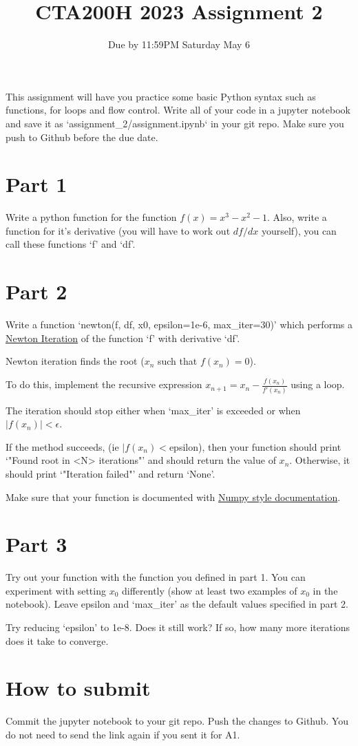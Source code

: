 \documentclass{article}
\title{CTA200H 2023 Assignment 2}
\author{Due by 11:59PM Saturday May 6}
\date{}
\begin{document}
\maketitle

This assignment will have you practice some basic Python syntax such as functions, for loops and flow control. Write all of your code in a jupyter notebook and save it as `assignment\_2/assignment.ipynb` in your git repo. Make sure you push to Github before the due date.

\section*{Part 1}

Write a python function for the function $f(x) = x^3 - x^2 - 1$. Also, write a function for it's derivative (you will have to work out $df/dx$ yourself), you can call these functions `f' and `df'.

\section*{Part 2}

Write a function `newton(f, df, x0, epsilon=1e-6, max\_iter=30)' which performs a \href{https://en.wikipedia.org/wiki/Newton%27s_method}{Newton Iteration} of the function `f' with derivative `df'.

Newton iteration finds the root ($x_n$ such that $f(x_n) = 0$).

To do this, implement the recursive expression $x_{n+1} = x_n - \frac{f(x_n)}{f'(x_n)}$ using a loop.

The iteration should stop either when `max\_iter' is exceeded or when $|f(x_n)| < \epsilon$.

If the method succeeds, (ie $|f(x_n) < $epsilon), then your function should print `"Found root in <N> iterations"' and should return the value of $x_n$. Otherwise, it should print `"Iteration failed"' and return `None'.

Make sure that your function is documented with \href{https://numpydoc.readthedocs.io/en/latest/format.html}{Numpy style documentation}.

\section*{Part 3}

Try out your function with the function you defined in part 1. You can experiment with setting $x_0$ differently (show at least two examples of $x_0$ in the notebook). Leave epsilon and `max\_iter' as the default values specified in part 2.

Try reducing `epsilon' to 1e-8. Does it still work? If so, how many more iterations does it take to converge.

\section*{How to submit}

Commit the jupyter notebook to your git repo. Push the changes to Github. You do not need to send the link again if you sent it for A1.
\end{document}
